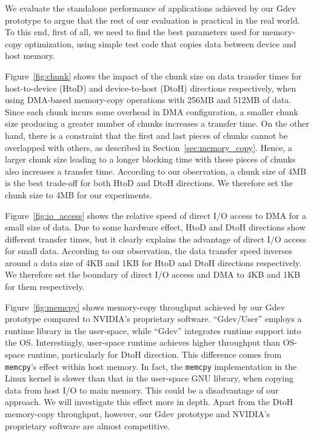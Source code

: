 We evaluate the standalone performance of applications achieved by
our Gdev prototype to argue that the rest of our evaluation is practical
in the real world.
To this end, first of all, we need to find the best parameters used for
memory-copy optimization, using simple test code that copies data
between device and host memory.

Figure~\ref{fig:chunk} shows the impact of the chunk size on data
transfer times for host-to-device (HtoD) and device-to-host (DtoH)
directions respectively, when using DMA-based memory-copy operations
with 256MB and 512MB of data.
Since each chunk incurs some overhead in DMA configuration, a
smaller chunk size producing a greater number of chunks increases a
transfer time.
On the other hand, there is a constraint that the first and last pieces
of chunks cannot be overlapped with others, as described in
Section~\ref{sec:memory_copy}.
Hence, a larger chunk size leading to a longer blocking time with these
pieces of chunks also increases a transfer time.
According to our observation, a chunk size of 4MB is the best trade-off
for both HtoD and DtoH directions.
We therefore set the chunk size to 4MB for our experiments.

Figure~\ref{fig:io_access} shows the relative speed of direct I/O
access to DMA for a small size of data. 
Due to some hardware effect, HtoD and DtoH directions show different
transfer times, but it clearly explains the advantage of direct I/O
access for small data.
According to our observation, the data transfer speed inverses around a
data size of 4KB and 1KB for HtoD and DtoH directions respectively.
We therefore set the boundary of direct I/O access and DMA to 4KB and
1KB for them respectively.

Figure~\ref{fig:memcpy} shows memory-copy throughput achieved
by our Gdev prototype compared to NVIDIA's proprietary software.
``Gdev/User'' employs a runtime library in the user-space, while
``Gdev'' integrates runtime support into the OS.
Interestingly, user-space runtime achieves higher throughput than
OS-space runtime, particularly for DtoH direction.
This difference comes from \texttt{memcpy}'s effect within host memory.
In fact, the \texttt{memcpy} implementation in the Linux kernel is slower
than that in the user-space GNU library, when copying data from host I/O
to main memory.
This could be a disadvantage of our approach.
We will investigate this effect more in depth.
Apart from the DtoH memory-copy throughput, however, our Gdev prototype
and NVIDIA's proprietary software are almost competitive.
 
